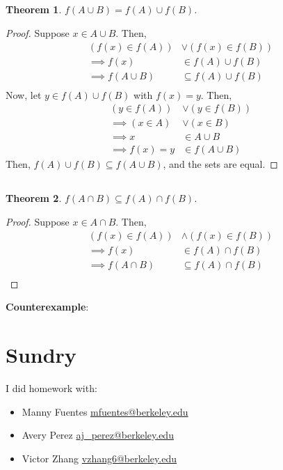 \documentclass{article}
\newtheorem{theorem}{Theorem}
\begin{document}
\subsection{}

\begin{theorem}
    \(f(A \cup B) = f(A) \cup f(B)\).
\end{theorem}
\begin{proof}
    Suppose \(x \in A \cup B\).
    Then,
    \begin{align}
        (f(x) \in f(A)) &\lor (f(x) \in f(B)) \\
        \implies f(x) &\in f(A) \cup f(B) \\
        \implies f(A \cup B) &\subseteq f(A) \cup f(B) \\
    \end{align}
    Now, let \(y \in f(A) \cup f(B)\) with \(f(x) = y\).
    Then,
    \begin{align}
        (y \in f(A)) &\lor (y \in f(B)) \\
        \implies (x \in A) &\lor (x \in B) \\
        \implies x &\in A \cup B \\
        \implies f(x) = y &\in f(A \cup B)
    \end{align}
    Then, \(f(A) \cup f(B) \subseteq f(A \cup B)\), and the sets are equal.
\end{proof}

\subsection{}

\begin{theorem}
    \(f(A \cap B) \subseteq f(A) \cap f(B)\).
\end{theorem}
\begin{proof}
    Suppose \(x \in A \cap B\).
    Then,
    \begin{align}
        (f(x) \in f(A)) &\land (f(x) \in f(B)) \\
        \implies f(x) &\in f(A) \cap f(B) \\
        \implies f(A \cap B) &\subseteq f(A) \cap f(B) \\
    \end{align}
\end{proof}
\textbf{Counterexample}: 

\section{Sundry}

I did homework with:
\begin{itemize}
    \item Manny Fuentes \href{mailto:mfuentes@berkeley.edu}{mfuentes@berkeley.edu}
    \item Avery Perez \href{mailto:aj_perez@berkeley.edu}{aj\_perez@berkeley.edu}
    \item Victor Zhang \href{mailto:vzhang6@berkeley.edu}{vzhang6@berkeley.edu}
\end{itemize}
\end{document}
